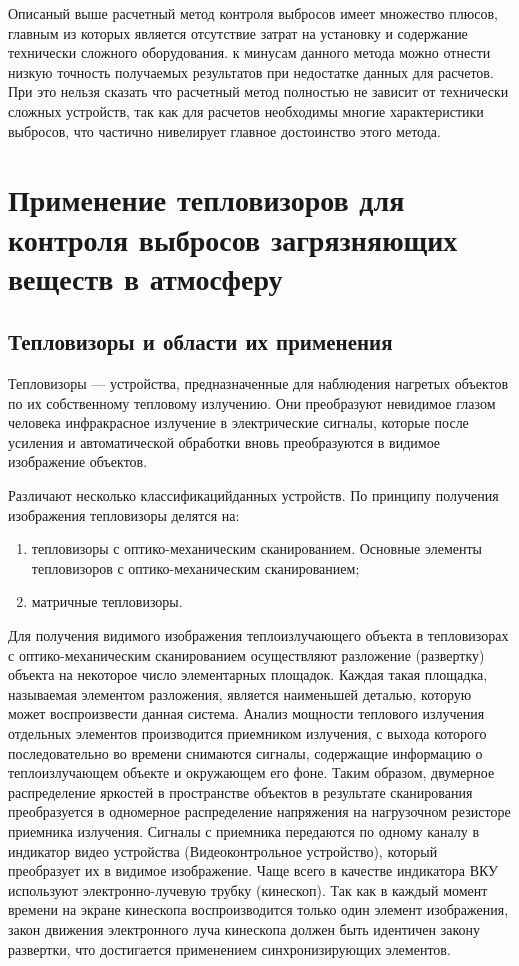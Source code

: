 \documentclass[14pt, a4paper]{extreport}
\begin{document}
	Описаный выше расчетный метод контроля выбросов имеет множество плюсов, главным из которых является отсутствие затрат на установку и содержание технически сложного оборудования. к минусам данного метода можно отнести низкую точность получаемых результатов при недостатке данных для расчетов. При это нельзя сказать что расчетный метод полностью не зависит от технически сложных устройств, так как для расчетов необходимы многие характеристики выбросов, что частично нивелирует главное достоинство этого метода.
	
\section [\vspace*{-0.22cm}Применение тепловизоров для контроля выбросов загрязняющих \hspace*{-0.85cm} веществ в атмосферу]{Применение тепловизоров для контроля выбросов загрязняющих веществ в атмосферу}
\subsection{Тепловизоры и области их применения}
	Тепловизоры — устройства, предназначенные для наблюдения нагретых объектов по их собственному тепловому излучению. Они преобразуют невидимое глазом человека инфракрасное излучение в электрические сигналы, которые после усиления и автоматической обработки вновь преобразуются в видимое изображение объектов.
	
	Различают несколько классификацийданных устройств. По принципу получения изображения тепловизоры делятся на:
	\begin{enumerate}[label={\arabic*)}]
		\item тепловизоры с оптико-механическим сканированием. Основные элементы тепловизоров с оптико-механическим сканированием;
		\item матричные тепловизоры.
	\end{enumerate}	

	Для получения видимого изображения теплоизлучающего объекта в тепловизорах с оптико-механическим сканированием осуществляют разложение (развертку) объекта на некоторое число элементарных площадок. Каждая такая площадка, называемая элементом разложения, является наименьшей деталью, которую может воспроизвести данная система. Анализ мощности теплового излучения отдельных элементов производится приемником излучения, с выхода которого последовательно во времени снимаются сигналы, содержащие информацию о теплоизлучающем объекте и окружающем его фоне. Таким образом, двумерное распределение яркостей в пространстве объектов в результате сканирования преобразуется в одномерное распределение напряжения на нагрузочном резисторе приемника излучения. Сигналы с приемника передаются по одному каналу в индикатор видео устройства (Видеоконтрольное устройство), который преобразует их в видимое изображение. Чаще всего в качестве индикатора ВКУ используют электронно-лучевую трубку (кинескоп). Так как в каждый момент времени на экране кинескопа воспроизводится только один элемент изображения, закон движения электронного луча кинескопа должен быть идентичен закону развертки, что достигается применением синхронизирующих элементов.
	
\end{document}
